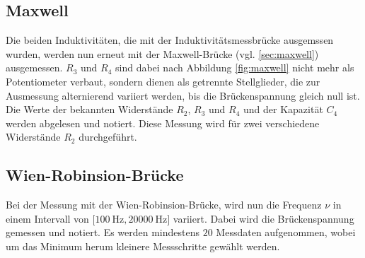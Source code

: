 \subsection{Maxwell}
\label{sec:durch-maxwell}
Die beiden Induktivitäten, die mit der Induktivitätsmessbrücke ausgemssen wurden, werden nun erneut mit der Maxwell-Brücke 
(vgl. \ref{sec:maxwell}) ausgemessen. $R_3$ und $R_4$ sind dabei nach Abbildung \ref{fig:maxwell} nicht mehr als Potentiometer
verbaut, sondern dienen als getrennte Stellglieder, die zur Ausmessung alternierend variiert werden, bis die Brückenspannung 
gleich null ist. 
Die Werte der bekannten Widerstände $R_2$, $R_3$ und $R_4$ und der Kapazität $C_4$ werden abgelesen und notiert. 
Diese Messung wird für zwei verschiedene Widerstände $R_2$ durchgeführt.

\subsection{Wien-Robinsion-Brücke}
\label{sec:durch-wien-robinson}
Bei der Messung mit der Wien-Robinsion-Brücke, wird nun die Frequenz $\nu$ in einem Intervall von $[\SI{100}{\hertz}, \SI{20000}{\hertz]}$ 
variiert. Dabei wird die Brückenspannung gemessen und notiert. Es werden mindestens $20$ Messdaten aufgenommen, wobei um das Minimum 
herum kleinere Messschritte gewählt werden. 